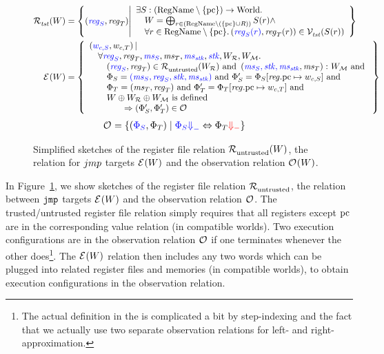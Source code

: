 \documentclass[acmsmall,review,showframe]{acmart}\settopmatter{printfolios=true,printccs=false,printacmref=false}
\renewcommand{\npair}[2][n]{#2}
\renewcommand{\RegName}{\shareddom{RegName}}
\renewcommand{\lre}[1][]{\typesetlr{E}^{#1}}
\renewcommand{\lrrg}[2][]{\typesetlr{R}^{#1}_{#2}}
\renewcommand{\lrr}[1][]{\lrrg[#1]{\untrusted}}
\renewcommand{\lro}[1][]{\typesetlr{O}^{#1}}
\renewcommand{\lrvg}[2][]{\typesetlr{V}^{#1}_{#2}}
\renewcommand{\lrrs}{\typesetlr{R}}
\renewcommand{\lrm}{\typesetlr{M}}
\renewcommand{\memSat}[3][]{\memSatGeneric{#1}{#2}{#3}{}}
\begin{document}
\begin{figure}
  \centering
\begin{align*}
  \lrrg{\trust}(W) &= \left\{ \npair{\stpair{\reg}{\reg}} \middle|
    \begin{array}{l}
      \exists S : (\RegName \setminus \{\pcreg \})\fun \World \ldotp \\
      \quad W = \bigoplus_{r \in (\RegName\setminus (\{\pcreg \} \cup R))} S(r) \wedge \\
      \quad \forall r \in \RegName \setminus \{\pcreg \}\ldotp \npair{\stpair[.]{\src{\reg_S(r)}}{\reg_T(r)}} \in \lrvg{\trust}(S(r))
    \end{array}
            \right\}\\
  \lre(W)&= \left\{ \begin{array}{l}
    \npair{\stpair[.]{w_{c,S}}{w_{c,T}}} | \\
    \quad\forall \src{\reg_S}, \reg_T, \src{\ms_S}, \ms_T, \src{\ms_\stk}, \src{\stk}, W_\lrrs , W_\lrm \ldotp \\
    \qquad\npair{\stpair{\reg}{\reg}} \in \lrr(W_\lrrs ) \tand \memSat{\stpair[.]{\ms_S,\stk,\ms_\stk}{\ms_T}}{W_\lrm} \tand\\
    \qquad\Phi_S = \src{(\ms_S,\reg_S,\stk, \ms_\stk)} \tand \Phi_S' = \Phi_S \updReg{\pcreg}{w_{c,S}} \tand\\
                     \qquad\Phi_T = (\ms_T,\reg_T) \tand \Phi_T' = \Phi_T\updReg{\pcreg}{w_{c,T}} \tand \\
                     \qquad W \oplus W_\lrrs \oplus W_\lrm \text{ is defined }\\
    \qquad\qquad\Rightarrow\npair{\left(\Phi_S', \Phi_T' \right)}\in \lro
  \end{array}
  \right\}
\end{align*}
  \begin{align*}
  \lro[] ={}&\{ \npair{\left(\src{\Phi_S},\Phi_T\right)} \mid
    \src{\Phi_S \sterm{}} \Leftrightarrow \Phi_T \trg{\term} \}
\end{align*}
\caption{Simplified sketches of the register file relation $\lrr(W)$, the relation
  for ${\color{black} jmp}$ targets $\lre(W)$  and the observation relation $\lro(W)$.}
\label{fig:obs-rel}
\end{figure}

In Figure~\ref{fig:obs-rel}, we show sketches of the register file relation $\lrr$, the relation between $\tjmp{}$ targets $\lre(W)$ and the observation relation $\lro$.
The trusted/untrusted register file relation simply requires that all registers except $\mathrm{pc}$ are in the corresponding value relation (in compatible worlds).
Two execution configurations are in the observation relation $\lro$ if one terminates whenever the other does\footnote{The actual definition in the \cite{technical_report} is complicated a bit by step-indexing and the fact that we actually use two separate observation relations for left- and right-approximation.}.
The $\lre(W)$ relation then includes any two words which can be plugged into related register files and memories (in compatible worlds), to obtain execution configurations in the observation relation.
\end{document}

